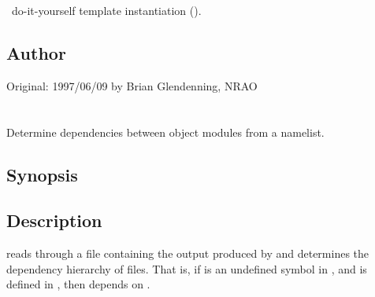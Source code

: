 \aipspp\ do-it-yourself template instantiation ().\\

\subsection*{Author}

Original: 1997/06/09 by Brian Glendenning, NRAO


\newpage
\section{}
\label{ldmap}

Determine dependencies between object modules from a namelist.

\subsection*{Synopsis}

\begin{synopsis}
\end{synopsis}

\subsection*{Description}

 reads through a file containing the output produced by
 and determines the dependency hierarchy of  files.  That
is, if  is an undefined symbol in , and  is defined
in , then  depends on .

